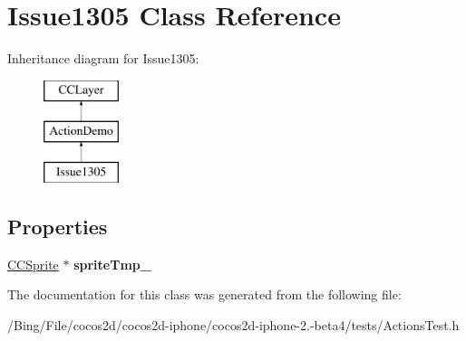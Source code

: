 \hypertarget{interface_issue1305}{\section{Issue1305 Class Reference}
\label{interface_issue1305}
}
Inheritance diagram for Issue1305\-:\begin{figure}[H]
\begin{center}
\leavevmode
\includegraphics[height=3.000000cm]{interface_issue1305}
\end{center}
\end{figure}
\subsection*{Properties}
\begin{DoxyCompactItemize}
\item 
\hypertarget{interface_issue1305_aad42bd80634286ee38380f437347b496}{\hyperlink{class_c_c_sprite}{C\-C\-Sprite} $\ast$ {\bfseries sprite\-Tmp\-\_\-}}\label{interface_issue1305_aad42bd80634286ee38380f437347b496}

\end{DoxyCompactItemize}


The documentation for this class was generated from the following file\-:\begin{DoxyCompactItemize}
\item 
/\-Bing/\-File/cocos2d/cocos2d-\/iphone/cocos2d-\/iphone-\/2.-\/beta4/tests/Actions\-Test.\-h\end{DoxyCompactItemize}
